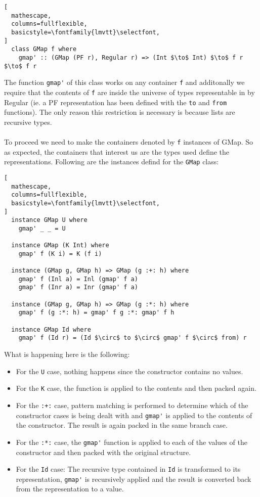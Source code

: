 \documentclass[8pt]{extarticle}
\begin{document}
\begin{lstlisting}[
  mathescape,
  columns=fullflexible,
  basicstyle=\fontfamily{lmvtt}\selectfont,
]
  class GMap f where
    gmap' :: (GMap (PF r), Regular r) => (Int $\to$ Int) $\to$ f r $\to$ f r
\end{lstlisting}
The function \verb+gmap'+ of this class works on any container \verb+f+ and additonally we require that the contents of \verb+f+ are inside the universe of types representable in by Regular (ie. a PF representation has been defined with the \verb+to+ and \verb+from+ functions). The only reason this restriction is necessary is because lists are recursive types.
\\\\
To proceed we need to make the containers denoted by \verb+f+ instances of GMap. So as expected, the containers that interest us are the types used define the representations. Following are the instances defind for the \verb+GMap+ class:
\begin{lstlisting}[
  mathescape,
  columns=fullflexible,
  basicstyle=\fontfamily{lmvtt}\selectfont,
]
  instance GMap U where
    gmap' _ _ = U

  instance GMap (K Int) where
    gmap' f (K i) = K (f i)

  instance (GMap g, GMap h) => GMap (g :+: h) where
    gmap' f (Inl a) = Inl (gmap' f a)
    gmap' f (Inr a) = Inr (gmap' f a)

  instance (GMap g, GMap h) => GMap (g :*: h) where
    gmap' f (g :*: h) = gmap' f g :*: gmap' f h

  instance GMap Id where
    gmap' f (Id r) = (Id $\circ$ to $\circ$ gmap' f $\circ$ from) r
\end{lstlisting}
What is happening here is the following:
\begin{itemize}
\item For the \verb+U+ case, nothing happens since the constructor contains no values.
\item For the \verb+K+ case, the function is applied to the contents and then packed again.
\item For the \verb-:+:- case, pattern matching is performed to determine which of the constructor cases is being dealt with and \verb+gmap'+ is applied to the contents of the constructor. The result is again packed in the same branch case.
\item For the \verb+:*:+ case, the \verb+gmap'+ function is applied to each of the values of the constructor and then packed with the original structure.
\item For the \verb+Id+ case: The recursive type contained in \verb+Id+ is transformed to its representation, \verb+gmap'+ is recursively applied and the result is converted back from the representation to a value.
\end{itemize}
\end{document}
